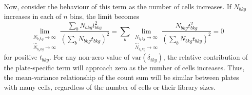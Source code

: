 \documentclass{article}
\begin{document}
Now, consider the behaviour of this term as the number of cells increases.
If $N_{bkg}$ increases in each of $n$ bins, the limit becomes
\[
    \lim_{\substack{N_{b_1kg} \to \infty \\ \dots \\ N_{b_nkg} \to \infty}} \frac{\sum_{b} N_{bkg} t_{bkg}^2}{ (\sum_{b} N_{bkg} t_{bkg})^2} 
    = \sum_{b} \lim_{\substack{N_{b_1kg} \to \infty \\ \dots \\ N_{b_nkg} \to \infty}} \frac{N_{bkg} t_{bkg}^2}{ (\sum_{b} N_{bkg} t_{bkg})^2} 
= 0
\]
for positive $t_{bkg}$.
For any non-zero value of $\mbox{var}(\delta_{ikg})$, the relative contribution of the plate-specific term will approach zero as the number of cells increases.
Thus, the mean-variance relationship of the count sum will be similar between plates with many cells, regardless of the number of cells or their library sizes.

%
\end{document}
